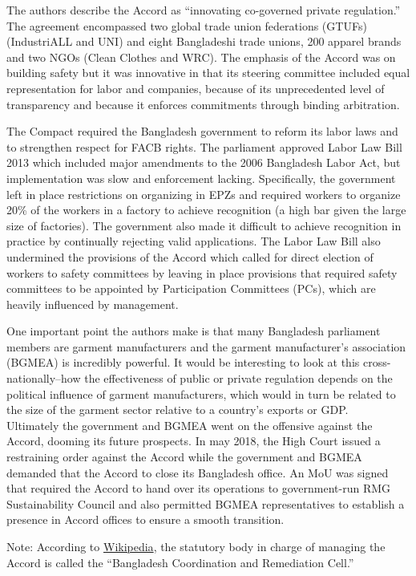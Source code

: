 \documentclass[
  12pt,
]{article}
\begin{document}
The authors describe the Accord as ``innovating co-governed private
regulation.'' The agreement encompassed two global trade union
federations (GTUFs) (IndustriALL and UNI) and eight Bangladeshi trade
unions, 200 apparel brands and two NGOs (Clean Clothes and WRC). The
emphasis of the Accord was on building safety but it was innovative in
that its steering committee included equal representation for labor and
companies, because of its unprecedented level of transparency and
because it enforces commitments through binding arbitration.

The Compact required the Bangladesh government to reform its labor laws
and to strengthen respect for FACB rights. The parliament approved Labor
Law Bill 2013 which included major amendments to the 2006 Bangladesh
Labor Act, but implementation was slow and enforcement lacking.
Specifically, the government left in place restrictions on organizing in
EPZs and required workers to organize 20\% of the workers in a factory
to achieve recognition (a high bar given the large size of factories).
The government also made it difficult to achieve recognition in practice
by continually rejecting valid applications. The Labor Law Bill also
undermined the provisions of the Accord which called for direct election
of workers to safety committees by leaving in place provisions that
required safety committees to be appointed by Participation Committees
(PCs), which are heavily influenced by management.

One important point the authors make is that many Bangladesh parliament
members are garment manufacturers and the garment manufacturer's
association (BGMEA) is incredibly powerful. It would be interesting to
look at this cross-nationally--how the effectiveness of public or
private regulation depends on the political influence of garment
manufacturers, which would in turn be related to the size of the garment
sector relative to a country's exports or GDP.\\
Ultimately the government and BGMEA went on the offensive against the
Accord, dooming its future prospects. In may 2018, the High Court issued
a restraining order against the Accord while the government and BGMEA
demanded that the Accord to close its Bangladesh office. An MoU was
signed that required the Accord to hand over its operations to
government-run RMG Sustainability Council and also permitted BGMEA
representatives to establish a presence in Accord offices to ensure a
smooth transition.

Note: According to
\href{https://en.wikipedia.org/wiki/Accord_on_Fire_and_Building_Safety_in_Bangladesh\#2018_Transition_Key_Accord}{Wikipedia},
the statutory body in charge of managing the Accord is called the
``Bangladesh Coordination and Remediation Cell.''
\end{document}
